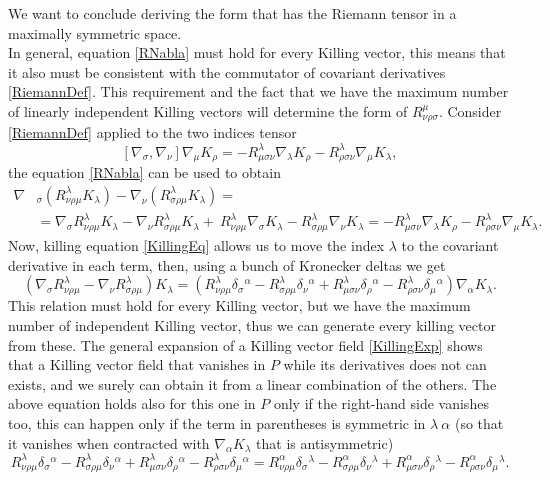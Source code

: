 We want to conclude deriving the form that has the Riemann tensor in a maximally symmetric space.\\
In general, equation \eqref{RNabla} must hold for every Killing vector, this means that it also must be consistent with the commutator of covariant derivatives \eqref{RiemannDef}. This requirement and the fact that we have the maximum number of linearly independent Killing vectors will determine the form of $R^\mu_{\nu\rho\sigma}$. Consider \eqref{RiemannDef} applied to the two indices tensor $$ [\nabla_\sigma,\nabla_\nu]\nabla_\mu K_\rho=-R^\lambda_{\mu\sigma\nu}\nabla_\lambda K_\rho-R^\lambda _{\rho\sigma\nu}\nabla_\mu K_\lambda,$$ the equation \eqref{RNabla} can be used to obtain 
\begin{align*}
    \nabla&_\sigma(R^\lambda_{\nu\rho\mu}K_\lambda)-\nabla_\nu(R^\lambda_{\sigma\rho\mu}K_\lambda)=\\&=\nabla_\sigma R^\lambda_{\nu\rho\mu}K_\lambda-\nabla_\nu R^\lambda_{\sigma\rho\mu}K_\lambda+\ R^\lambda_{\nu\rho\mu}\nabla_\sigma K_\lambda- R^\lambda_{\sigma\rho\mu}\nabla_\nu K_\lambda=-R^\lambda_{\mu\sigma\nu}\nabla_\lambda K_\rho-R^\lambda _{\rho\sigma\nu}\nabla_\mu K_\lambda.
\end{align*}
Now, killing equation \eqref{KillingEq} allows us to move the index $\lambda$ to the covariant derivative in each term, then, using a bunch of Kronecker deltas we get $$ (\nabla_\sigma R^\lambda_{\nu\rho\mu}-\nabla_\nu R^\lambda_{\sigma\rho\mu})K_\lambda=(R^\lambda_{\nu\rho\mu}\delta_{\sigma}\phantom{}^\alpha-R^\lambda_{\sigma\rho\mu}\delta_{\nu}\phantom{}^\alpha+R^\lambda_{\mu\sigma\nu}\delta_{\rho}\phantom{}^\alpha-R^\lambda_{\rho\sigma\nu}\delta_{\mu}\phantom{}^\alpha)\nabla_\alpha K_\lambda.$$
This relation must hold for every Killing vector, but we have the maximum number of independent Killing vector, thus we can generate every killing vector from these. The general expansion of a Killing vector field \eqref{KillingExp} shows that a Killing vector field that vanishes in $P$ while its derivatives does not can exists, and we surely can obtain it from a linear combination of the others. The above equation holds also for this one in $P$ only if the right-hand side vanishes too, this can happen only if the term in parentheses is symmetric in $\lambda\ \alpha$ (so that it vanishes when contracted with $\nabla_\alpha K_\lambda$ that is antisymmetric)$$R^\lambda_{\nu\rho\mu}\delta_{\sigma}\phantom{}^\alpha-R^\lambda_{\sigma\rho\mu}\delta_{\nu}\phantom{}^\alpha+R^\lambda_{\mu\sigma\nu}\delta_{\rho}\phantom{}^\alpha-R^\lambda_{\rho\sigma\nu}\delta_{\mu}\phantom{}^\alpha=R^\alpha_{\nu\rho\mu}\delta_{\sigma}\phantom{}^\lambda-R^\alpha_{\sigma\rho\mu}\delta_{\nu}\phantom{}^\lambda+R^\alpha_{\mu\sigma\nu}\delta_{\rho}\phantom{}^\lambda-R^\alpha_{\rho\sigma\nu}\delta_{\mu}\phantom{}^\lambda.$$
